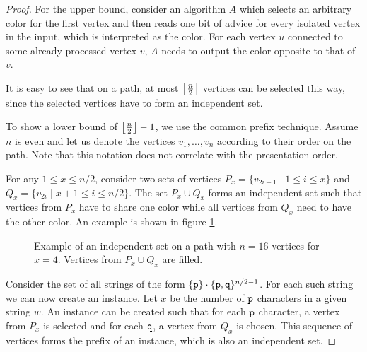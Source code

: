 \begin{proof}
    For the upper bound, consider an algorithm $A$ which selects an
    arbitrary color for the first vertex and then reads one bit of advice
    for every isolated vertex in the input, which is interpreted as the
    color. For each vertex $u$ connected to some already processed vertex
    $v$, $A$ needs to output the color opposite to that of $v$.

    It is easy to see that on a path, at most $\ceil*{\frac{n}{2}}$
    vertices can be selected this way, since the selected vertices have to
    form an independent set.

    To show a lower bound of $\floor*{\frac{n}{2}} - 1$, we use the common
    prefix technique. Assume $n$ is even and let us denote the vertices
    $v_1, \dots, v_n$ according to their order on the path. Note that this
    notation does not correlate with the presentation order.
    
    For any $1 \leq x \leq n/2$, consider two sets of vertices
    $P_x = \{v_{2i - 1} \mid 1 \leq i \leq x\}$ and $Q_x = \{v_{2i} \mid
    x + 1 \leq i \leq n/2\}$. The set $P_x \cup Q_x$ forms an independent
    set such that vertices from $P_x$ have to share one color while all
    vertices from $Q_x$ need to have the other color. An example is shown
    in figure \ref{fig:path-mis}.

    \begin{figure}\centering
        \caption{Example of an independent set on a path with $n = 16$
            vertices for $x = 4$. Vertices from $P_x \cup Q_x$ are
            filled.}
        \label{fig:path-mis}
    \end{figure}

    Consider the set of all strings of the form
    $\{\verb|p|\}\cdot\{\verb|p|,\verb|q|\}^{n/2-1}$. For each such string
    we can now create an instance. Let $x$ be the number of $\verb|p|$
    characters in a given string $w$. An instance can be created such that
    for each $\verb|p|$ character, a vertex from $P_x$ is selected and for
    each $\verb|q|$, a vertex from $Q_x$ is chosen. This sequence of
    vertices forms the prefix of an instance, which is also an independent
    set.


\end{proof}
